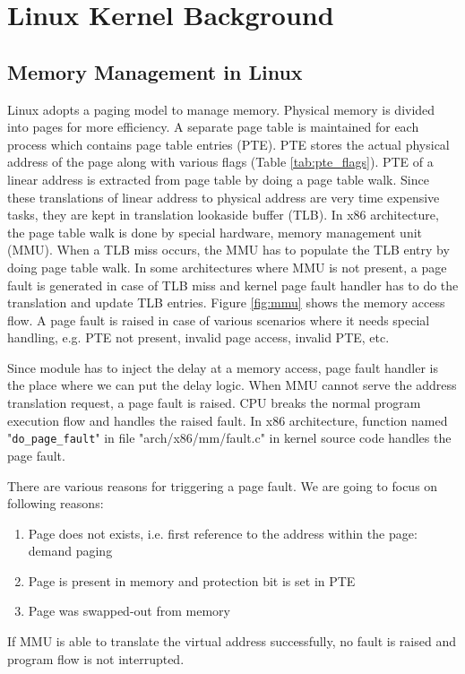 
\chapter{Linux Kernel Background}

\section{Memory Management in Linux}
Linux adopts a paging model to manage memory. Physical memory is divided into pages for more efficiency. A separate page table is maintained for each process which contains page table entries (PTE). PTE stores the actual physical address of the page along with various flags (Table \ref{tab:pte_flags}). PTE of a linear address is extracted from page table by doing a page table walk. Since these translations of linear address to physical address are very time expensive tasks, they are kept in translation lookaside buffer (TLB). In x86 architecture, the page table walk is done by special hardware, memory management unit (MMU). When a TLB miss occurs, the MMU has to populate the TLB entry by doing page table walk. In some architectures where MMU is not present, a page fault is generated in case of TLB miss and kernel page fault handler has to do the translation and update TLB entries. Figure \ref{fig:mmu} shows the memory access flow. A page fault is raised in case of various scenarios where it needs special handling, e.g. PTE not present, invalid page access, invalid PTE, etc.

Since module has to inject the delay at a memory access, page fault handler is the place where we can put the delay logic. When MMU cannot serve the address translation request, a page fault is raised. CPU breaks the normal program execution flow and handles the raised fault. In x86 architecture, function named "\verb|do_page_fault|" in file "arch/x86/mm/fault.c" in kernel source code handles the page fault.

There are various reasons for triggering a page fault. We are going to focus on following reasons:
\begin{enumerate}
	\item Page does not exists, i.e. first reference to the address within the page: demand paging
	\item Page is present in memory and protection bit is set in PTE
	\item Page was swapped-out from memory
\end{enumerate}

If MMU is able to translate the virtual address successfully, no fault is raised and program flow is not interrupted.

